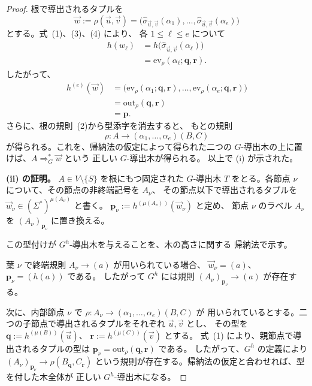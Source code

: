 \documentclass[11pt,a4paper]{ltjsarticle}
\theoremstyle{remark}
\newcommand{\out}{\mathrm{out}}
\newcommand{\ev}{\mathrm{ev}}
\newcommand{\tuple}[1]{\vec{#1}}
\begin{document}
\begin{proof}
根で導出されるタプルを
\[
  \tuple w
  :=
  \rho(\tuple u,\tuple v)
  =
  \bigl(
    \widehat{\sigma}_{\tuple u,\tuple v}(\alpha_1),
    \ldots,
    \widehat{\sigma}_{\tuple u,\tuple v}(\alpha_e)
  \bigr)
\]
とする。式~\textup{(1)}、\textup{(3)}、\textup{(4)} により、
各 \(1\le\ell\le e\) について
\[
\begin{aligned}
  h(w_\ell)
  &=
  h\bigl(
    \widehat{\sigma}_{\tuple u,\tuple v}(\alpha_\ell)
  \bigr)
  \\
  &=
  \ev_\rho(\alpha_\ell;\mathbf q,\mathbf r).
\end{aligned}
\]
したがって、
\[
\begin{aligned}
  h^{(e)}(\tuple w)
  &=
  \bigl(
    \ev_\rho(\alpha_1;\mathbf q,\mathbf r),
    \ldots,
    \ev_\rho(\alpha_e;\mathbf q,\mathbf r)
  \bigr)
  \\
  &=
  \out_\rho(\mathbf q,\mathbf r)
  \\
  &=
  \mathbf p.
\end{aligned}
\]
さらに、根の規則~\textup{(2)}から型添字を消去すると、
もとの規則
\[
  \rho\colon
  A\to(\alpha_1,\ldots,\alpha_e)(B,C)
\]
が得られる。これを、帰納法の仮定によって得られた二つの
\(G\)-導出木の上に置けば、\(A\Rightarrow_G^*\tuple w\) という
正しい \(G\)-導出木が得られる。
以上で (i) が示された。

\medskip
\noindent
\textbf{(ii) の証明。}
\(A\in V\setminus\{S\}\) を根にもつ固定された \(G\)-導出木
\(T\) をとる。各節点 \(\nu\) について、その節点の非終端記号を \(A_\nu\)、
その節点以下で導出されるタプルを
\(\tuple w_\nu\in(\Sigma^*)^{\mu(A_\nu)}\) と書く。
\(\mathbf p_\nu:=h^{(\mu(A_\nu))}(\tuple w_\nu)\) と定め、
節点 \(\nu\) のラベル \(A_\nu\) を \((A_\nu)_{\mathbf p_\nu}\) に置き換える。

この型付けが \(G^h\)-導出木を与えることを、木の高さに関する
帰納法で示す。

葉 \(\nu\) で終端規則 \(A_\nu\to(a)\) が用いられている場合、
\(\tuple w_\nu=(a)\)、\(\mathbf p_\nu=(h(a))\) である。
したがって \(G^h\) には規則 \((A_\nu)_{\mathbf p_\nu}\to(a)\) が存在する。

次に、内部節点 \(\nu\) で
\(\rho\colon A_\nu\to(\alpha_1,\ldots,\alpha_e)(B,C)\) が
用いられているとする。二つの子節点で導出されるタプルをそれぞれ \(\tuple u,\tuple v\) とし、
その型を \(\mathbf q:=h^{(\mu(B))}(\tuple u)\)、
\(\mathbf r:=h^{(\mu(C))}(\tuple v)\) とする。
式~\textup{(1)} により、親節点で導出されるタプルの型は
\(\mathbf p_\nu=\out_\rho(\mathbf q,\mathbf r)\) である。
したがって、\(G^h\) の定義により
\((A_\nu)_{\mathbf p_\nu}\to\rho(B_{\mathbf q},C_{\mathbf r})\)
という規則が存在する。帰納法の仮定と合わせれば、型を付した木全体が
正しい \(G^h\)-導出木になる。


\end{proof}
\end{document}
